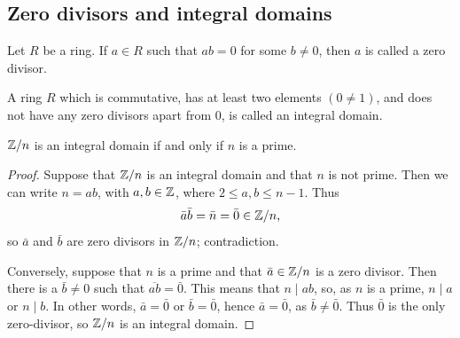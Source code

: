 \documentclass[10pt, a4paper]{article}
\begin{document}
\subsection{Zero divisors and integral domains}

\begin{definition}
    Let $R$ be a ring.
    If $a \in R$ such that $ab = 0$ for some $b \neq 0$,
    then $a$ is called a zero divisor.
\end{definition}

\begin{definition}
    A ring $R$ which is commutative,
    has at least two elements
    $(0 \neq 1)$,
    and does not have any zero divisors apart from $0$,
    is called an integral domain.
\end{definition}

\begin{lemma}
    $\mathbb{Z} / n$ is an integral domain if and only if $n$ is a prime.

    \begin{proof}
        Suppose that $\mathbb{Z} / n$ is an integral domain and that $n$ is not prime.
        Then we can write $n = ab$,
        with $a, b \in \mathbb{Z}$,
        where $2 \leq a, b \leq n - 1$.
        Thus
        \[
        \bar{a}\bar{b} = \bar{n} = \bar{0} \in \mathbb{Z} / n,
        \]
        so $\bar{a}$ and $\bar{b}$ are zero divisors in $\mathbb{Z} / n$;
        contradiction.

        Conversely,
        suppose that $n$ is a prime and that $\bar{a} \in \mathbb{Z} / n$ is a zero divisor.
        Then there is a $\bar{b} \neq 0$ such that $\overline{ab} = \bar{0}$.
        This means that $n \mid ab$,
        so,
        as $n$ is a prime,
        $n \mid a$ or $n \mid b$.
        In other words,
        $\bar{a} = \bar{0}$ or $\bar{b} = \bar{0}$,
        hence $\bar{a} = \bar{0}$,
        as $\bar{b} \neq \bar{0}$.
        Thus $\bar{0}$ is the only zero-divisor,
        so $\mathbb{Z} / n$ is an integral domain.
    \end{proof}
\end{lemma}
\end{document}
